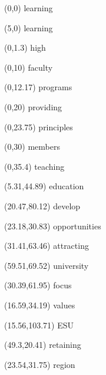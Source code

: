 \documentclass[11pt]{letter} %
\begin{document}
\begin{textblock}{0}(0,0) \tiny{learning} \end{textblock}
\begin{textblock}{0}(5,0) \tiny{learning} \end{textblock}
\begin{textblock}{0}(0,1.3) \tiny{high} \end{textblock}
\begin{textblock}{0}(0,10) \small{faculty} \end{textblock}
\begin{textblock}{0}(0,12.17) \small{programs} \end{textblock}
\begin{textblock}{0}(0,20) \LARGE{providing} \end{textblock}
\begin{textblock}{0}(0,23.75) \LARGE{principles} \end{textblock}
\begin{textblock}{0}(0,30) \Huge{members} \end{textblock}
\begin{textblock}{0}(0,35.4) \Huge{teaching} \end{textblock}
\begin{textblock}{0}(5.31,44.89) \footnotesize{education} \end{textblock}
\begin{textblock}{0}(20.47,80.12) \scriptsize{develop} \end{textblock}
\begin{textblock}{0}(23.18,30.83) \LARGE{opportunities} \end{textblock}
\begin{textblock}{0}(31.41,63.46) \small{attracting} \end{textblock}
\begin{textblock}{0}(59.51,69.52) \huge{university} \end{textblock}
\begin{textblock}{0}(30.39,61.95) \tiny{focus} \end{textblock}
\begin{textblock}{0}(16.59,34.19) \small{values} \end{textblock}
\begin{textblock}{0}(15.56,103.71) \tiny{ESU} \end{textblock}
\begin{textblock}{0}(49.3,20.41) \normalsize{retaining} \end{textblock}
\begin{textblock}{0}(23.54,31.75) \small{region} \end{textblock}
\end{document}
